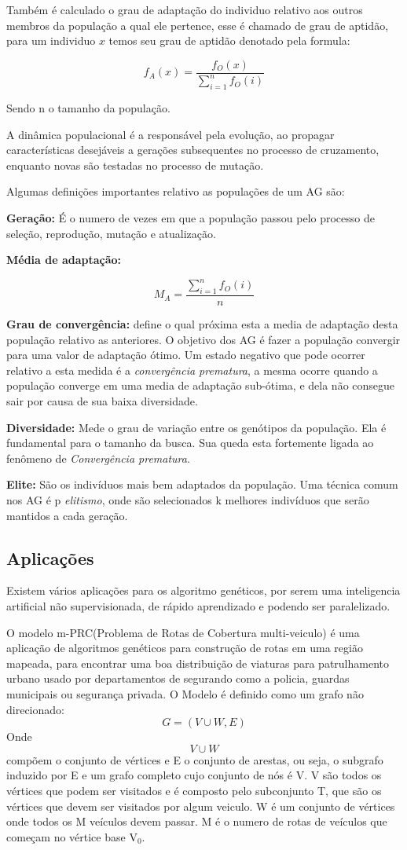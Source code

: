 Também é calculado o grau de adaptação do individuo relativo aos outros membros da população a qual ele pertence, esse é chamado de grau de aptidão, para um individuo $x$ temos seu grau de aptidão denotado pela formula:

\[f_A(x) = \frac{f_O(x)}{ \sum_{i=1}^{n}  f_O(i)  }  \]

 Sendo n o tamanho da população.
 
 A dinâmica populacional é a responsável pela evolução, ao propagar características desejáveis a gerações subsequentes no processo de cruzamento, enquanto novas são testadas no processo de mutação.
 
 Algumas definições importantes relativo as populações de um AG são:
 
 \textbf{Geração:} É o numero de vezes em que a população passou pelo processo de seleção, reprodução, mutação e atualização.

\textbf{Média de adaptação:} 

\[ M_A = \frac{ \sum_{i=1}^{n} f_O(i) }{n} \]

\textbf{Grau de convergência:} define o qual próxima esta a media de adaptação desta população relativo as anteriores. O objetivo dos AG é fazer a população convergir para uma valor de adaptação ótimo.
Um estado negativo que pode ocorrer relativo a esta medida é a \textit{convergência prematura}, a mesma ocorre quando a população converge em uma media de adaptação sub-ótima, e dela não consegue sair por causa de sua baixa diversidade.

\textbf{Diversidade:} Mede o grau de variação entre os genótipos da população. Ela é fundamental para o tamanho da busca.
Sua queda esta fortemente ligada ao fenômeno de \textit{Convergência prematura}.

\textbf{Elite:} São os indivíduos mais bem adaptados da população. Uma técnica comum nos AG é p \textit{elitismo}, onde são selecionados k melhores indivíduos que serão mantidos a cada geração.

\subsection{Aplicações}
Existem vários aplicações para os algoritmo genéticos, por serem uma inteligencia artificial não supervisionada, de rápido aprendizado e podendo ser paralelizado.

O modelo m-PRC(Problema de Rotas de Cobertura multi-veiculo) é uma aplicação de algoritmos genéticos para construção de rotas em uma região mapeada, para encontrar uma boa distribuição de viaturas para patrulhamento urbano usado por departamentos de segurando como a policia, guardas municipais ou segurança privada. 
O Modelo é definido como um grafo não direcionado: \[G=(V\cup W, E)\] Onde \[V\cup W\] compõem o conjunto de vértices e E o conjunto de arestas, ou seja, o subgrafo induzido por E e um grafo completo cujo conjunto de nós é V. 
V são todos os vértices que podem ser visitados e é composto pelo subconjunto T, que são os vértices que devem ser visitados por algum veiculo. W é um conjunto de vértices onde todos os M veículos devem passar. M é o numero de rotas de veículos que começam no vértice base V$_0$. 


